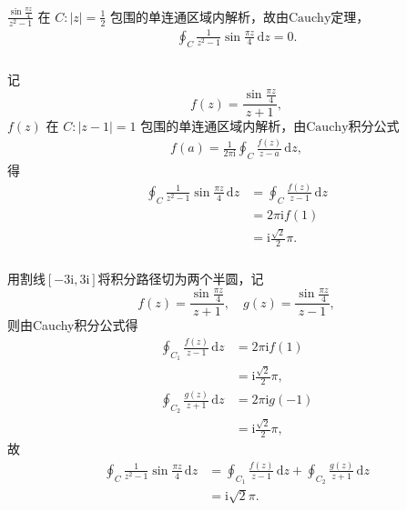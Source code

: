 \documentclass[12pt]{article}
\newcommand{\mrm}[1]{\mathrm{#1}}
\begin{document}
\section{}
\subsection{}
\subsubsection{}
$\frac{\sin \frac{\pi z}{4}}{z^2 - 1}$ 在 $C: \vert z \vert = \frac{1}{2}$ 包围的单连通区域内解析，故由$\mathrm{Cauchy}$定理，
\begin{align*}
\oint_{C} \frac{1}{z^2 - 1} \sin \frac{\pi z}{4} \,\mathrm{d}z = 0.
\end{align*}
\subsubsection{}
记\[f(z) = \frac{\sin \frac{\pi z}{4}}{z+1},\]$f(z)$ 在 $C: \vert z - 1 \vert = 1$ 包围的单连通区域内解析，由$\mathrm{Cauchy}$积分公式
\begin{align*}
f(a) = \frac{1}{2\pi \mathrm{i}} \oint_{C} \frac{f(z)}{z - a} \,\mathrm{d}z,
\end{align*}
得
\begin{align*}
\oint_{C} \frac{1}{z^2 - 1} \sin \frac{\pi z}{4} \,\mathrm{d}z&=\oint_{C} \frac{f(z)}{z - 1} \,\mathrm{d}z \\
&= 2\pi \mathrm{i} f(1) \\
&= \mathrm{i} \frac{\sqrt{2}}{2} \pi.
\end{align*}
\subsubsection{}
用割线\([-3\mrm i, 3\mrm i]\)将积分路径切为两个半圆，记\[f(z) = \frac{\sin \frac{\pi z}{4}}{z+1}, \quad g(z) = \frac{\sin \frac{\pi z}{4}}{z-1},\]
则由Cauchy积分公式得
\begin{align*}
\oint_{C_1} \frac{f(z)}{z - 1} \,\mathrm{d}z &= 2\pi \mathrm{i} f(1) \\
&= \mathrm{i} \frac{\sqrt{2}}{2} \pi, \\
\oint_{C_2} \frac{g(z)}{z + 1} \,\mathrm{d}z &= 2\pi \mathrm{i} g(-1) \\
&= \mathrm{i} \frac{\sqrt{2}}{2} \pi,
\end{align*}
故
\begin{align*}
\oint_{C} \frac{1}{z^2 - 1} \sin \frac{\pi z}{4} \,\mathrm{d}z &= \oint_{C_1} \frac{f(z)}{z - 1} \,\mathrm{d}z + \oint_{C_2} \frac{g(z)}{z + 1} \,\mathrm{d}z \\
&= \mathrm{i} \sqrt{2} \pi.
\end{align*}
\end{document}
